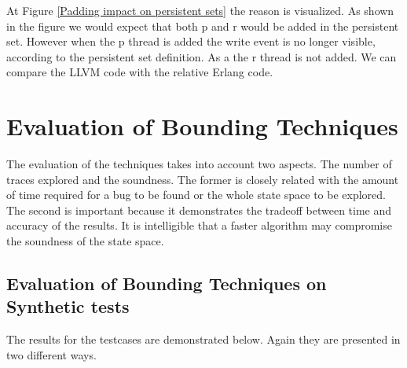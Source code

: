 At Figure \ref{Padding impact on persistent sets} the reason is visualized. As shown in the figure we would expect that both p and r would be added in the persistent set. However when the p thread is added the write event is no longer visible, 
according to the persistent set definition. As a the r thread is not added. We can compare the LLVM code with the relative Erlang code.




\section{Evaluation of Bounding Techniques}
The evaluation of the techniques takes into account two aspects. The number of traces explored and the soundness. The former is closely related with the amount
of time required for a bug to be found or the whole state space to be explored. The second is important because it demonstrates the tradeoff between time and accuracy
of the results. It is intelligible that a faster algorithm may compromise the soundness of the state space.
\subsection{Evaluation of Bounding Techniques on Synthetic tests}

The results for the testcases are demonstrated below. Again they are presented in two different ways.



